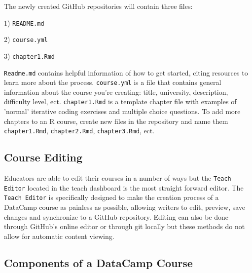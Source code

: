 \documentclass[12pt]{article}\usepackage[]{graphicx}\usepackage[]{color}
\begin{document}
The newly created GitHub repositories will contain three files: 

1) \texttt{README.md}

2) \texttt{course.yml}

3) \texttt{chapter1.Rmd}

\texttt{Readme.md} contains helpful information of how to get started, citing resources to learn more about the process.
\texttt{course.yml} is a file that contains general information about the course you're creating: title, university, description,
difficulty level, ect.
\texttt{chapter1.Rmd} is a template chapter file with examples of 'normal' iterative coding exercises and multiple choice questions.
To add more chapters to an R course, create new files in the repository and name them \texttt{chapter1.Rmd}, \texttt{chapter2.Rmd},
\texttt{chapter3.Rmd}, ect.

\subsection{Course Editing}
Educators are able to edit their courses in a number of ways but the \texttt{Teach Editor} located in the teach dashboard is the
most straight forward editor. The \texttt{Teach Editor} is specifically designed to make the creation process of a DataCamp course
as painless as possible, allowing writers to edit, preview, save changes and synchronize to a GitHub repository. Editing can
also be done through GitHub's online editor or through git locally but these methods do not allow for automatic content
viewing.
\subsection{Components of a DataCamp Course}
\end{document}

